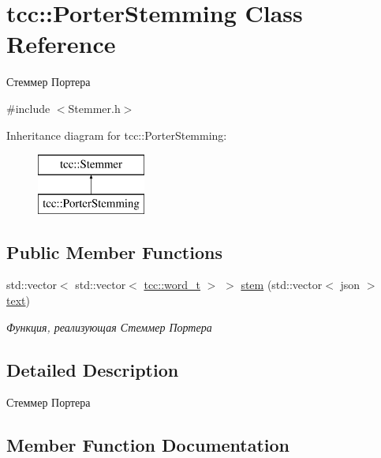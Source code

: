 \hypertarget{classtcc_1_1_porter_stemming}{}\section{tcc\+:\+:Porter\+Stemming Class Reference}
\label{classtcc_1_1_porter_stemming}


Стеммер Портера  




{\ttfamily \#include $<$Stemmer.\+h$>$}

Inheritance diagram for tcc\+:\+:Porter\+Stemming\+:\begin{figure}[H]
\begin{center}
\leavevmode
\includegraphics[height=2.000000cm]{classtcc_1_1_porter_stemming}
\end{center}
\end{figure}
\subsection*{Public Member Functions}
\begin{DoxyCompactItemize}
\item 
std\+::vector$<$ std\+::vector$<$ \hyperlink{namespacetcc_a310a95f44f9f0b3198b9758732eba6b9}{tcc\+::word\+\_\+t} $>$ $>$ \hyperlink{classtcc_1_1_porter_stemming_a55589afcaad97b491ec344cc24a889d9}{stem} (std\+::vector$<$ json $>$ \hyperlink{group__aliases_ga085c5ca5bf5645ff17c0ede30f56b08f}{text})
\begin{DoxyCompactList}\small\item\em Функция, реализующая Стеммер Портера \end{DoxyCompactList}\end{DoxyCompactItemize}


\subsection{Detailed Description}
Стеммер Портера 

\subsection{Member Function Documentation}

